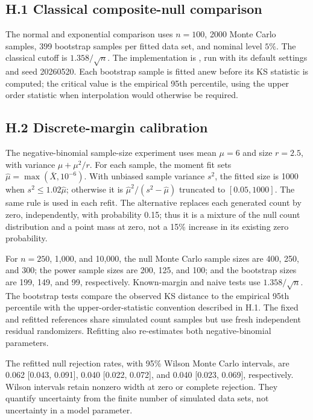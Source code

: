 \documentclass[12pt]{article}
\theoremstyle{remark}
\begin{document}
\subsection*{H.1 Classical composite-null comparison}

The normal and exponential comparison uses $n=100$, 2000 Monte Carlo samples,
399 bootstrap samples per fitted data set, and nominal level $5\%$.
The classical cutoff is $1.358/\sqrt n$. The implementation is
, run with its default settings and
seed 20260520. Each bootstrap sample is fitted anew before its KS statistic is
computed; the critical value is the empirical 95th percentile, using the
upper order statistic when interpolation would otherwise be required.

\subsection*{H.2 Discrete-margin calibration}

The negative-binomial sample-size experiment uses mean $\mu=6$ and size
$r=2.5$, with variance $\mu+\mu^2/r$. For each sample, the moment fit sets
$\widehat\mu=\max(\bar X,10^{-6})$. With unbiased sample variance $s^2$,
the fitted size is 1000 when $s^2\le1.02\widehat\mu$; otherwise it is
$\widehat\mu^2/(s^2-\widehat\mu)$ truncated to $[0.05,1000]$. The same rule
is used in each refit. The alternative replaces each generated count by zero,
independently, with probability 0.15; thus it is a mixture of the null count
distribution and a point mass at zero, not a 15\% increase in its existing
zero probability.

For $n=250$, 1,000, and 10,000, the null Monte Carlo sample sizes are 400,
250, and 300; the power sample sizes are 200, 125, and 100; and the bootstrap
sizes are 199, 149, and 99, respectively. Known-margin and naive tests use
$1.358/\sqrt n$. The bootstrap tests compare the observed KS distance to the
empirical 95th percentile with the upper-order-statistic convention described
in H.1. The fixed and refitted references share simulated count samples but
use fresh independent residual randomizers. Refitting also re-estimates both
negative-binomial parameters.

The refitted null rejection rates, with 95\% Wilson Monte Carlo
intervals, are 0.062 [0.043, 0.091], 0.040 [0.022, 0.072], and
0.040 [0.023, 0.069], respectively. Wilson intervals retain nonzero width
at zero or complete rejection. They quantify uncertainty from the finite
number of simulated data sets, not uncertainty in a model parameter.
\end{document}
